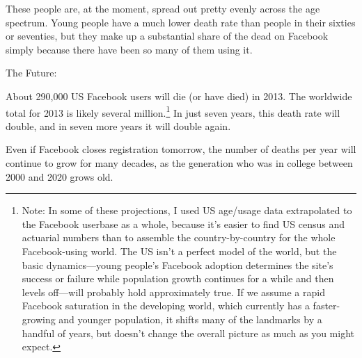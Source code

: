 {{These people are, at the moment, spread out pretty evenly across the age spectrum. Young people have a much lower death rate than people in their sixties or seventies, but they make up a substantial share of the dead on Facebook simply because there have been so many of them using it.}

{The Future:}

{About 290,000 US Facebook users will die (or have died) in 2013. The worldwide total for 2013 is likely several million.{\footnote{Note: In some of these projections, I used US age/usage data extrapolated to the Facebook userbase as a whole, because it's easier to find US census and actuarial numbers than to assemble the country-by-country for the whole Facebook-using world. The US isn't a perfect model of the world, but the basic dynamics—young people's Facebook adoption determines the site's success or failure while population growth continues for a while and then levels off—will probably hold approximately true. If we assume a rapid Facebook saturation in the developing world, which currently has a faster-growing and younger population, it shifts many of the landmarks by a handful of years, but doesn't change the overall picture as much as you might expect.} } In just seven years, this death rate will double, and in seven more years it will double again.}

{Even if Facebook closes registration tomorrow, the number of deaths per year will continue to grow for many decades, as the generation who was in college between 2000 and 2020 grows old.}

}
